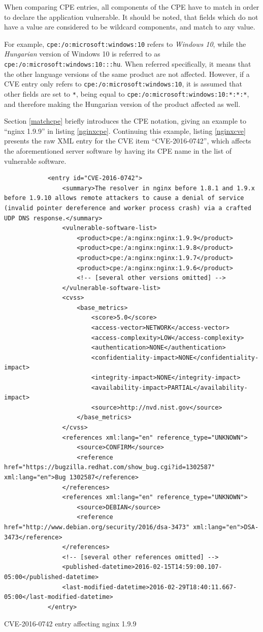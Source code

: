\documentclass[a4paper,12pt]{article}
\begin{document}
	When comparing CPE entries, all components of the CPE have to match in order to declare the application vulnerable. It should be noted, that fields which do not have a value are considered to be wildcard components, and match to any value.
	
	For example, \texttt{cpe:/o:microsoft:windows:10} refers to \textit{Windows 10}, while the \textit{Hungarian} version of Windows 10 is referred to as \texttt{cpe:/o:microsoft:windows:10:::hu}. When referred specifically, it means that the other language versions of the same product are not affected. However, if a CVE entry only refers to \texttt{cpe:/o:microsoft:windows:10}, it is assumed that other fields are set to \texttt{*}, being equal to \texttt{cpe:/o:microsoft:windows:10:*:*:*}, and therefore making the Hungarian version of the product affected as well.
	
	Section \ref{matchcpe} briefly introduces the CPE notation, giving an example to ``nginx 1.9.9'' in listing \ref{nginxcpe}. Continuing this example, listing \ref{nginxcve} presents the raw XML entry for the CVE item ``CVE-2016-0742'', which affects the aforementioned server software by having its CPE name in the list of vulnerable software.
	
	\begin{listing}[H]
		\begin{verbatim}
			<entry id="CVE-2016-0742">
				<summary>The resolver in nginx before 1.8.1 and 1.9.x before 1.9.10 allows remote attackers to cause a denial of service (invalid pointer dereference and worker process crash) via a crafted UDP DNS response.</summary>
				<vulnerable-software-list>
					<product>cpe:/a:nginx:nginx:1.9.9</product>
					<product>cpe:/a:nginx:nginx:1.9.8</product>
					<product>cpe:/a:nginx:nginx:1.9.7</product>
					<product>cpe:/a:nginx:nginx:1.9.6</product>
					<!-- [several other versions omitted] -->
				</vulnerable-software-list>
				<cvss>
					<base_metrics>
						<score>5.0</score>
						<access-vector>NETWORK</access-vector>
						<access-complexity>LOW</access-complexity>
						<authentication>NONE</authentication>
						<confidentiality-impact>NONE</confidentiality-impact>
						<integrity-impact>NONE</integrity-impact>
						<availability-impact>PARTIAL</availability-impact>
						<source>http://nvd.nist.gov</source>
					</base_metrics>
				</cvss>
				<references xml:lang="en" reference_type="UNKNOWN">
					<source>CONFIRM</source>
					<reference href="https://bugzilla.redhat.com/show_bug.cgi?id=1302587" xml:lang="en">Bug 1302587</reference>
				</references>
				<references xml:lang="en" reference_type="UNKNOWN">
					<source>DEBIAN</source>
					<reference href="http://www.debian.org/security/2016/dsa-3473" xml:lang="en">DSA-3473</reference>
				</references>
				<!-- [several other references omitted] -->
				<published-datetime>2016-02-15T14:59:00.107-05:00</published-datetime>
				<last-modified-datetime>2016-02-29T18:40:11.667-05:00</last-modified-datetime>
			</entry>
		\end{verbatim}
		\caption{CVE-2016-0742 entry affecting nginx 1.9.9}
		\label{nginxcve}
	\end{listing}
	
\end{document}
